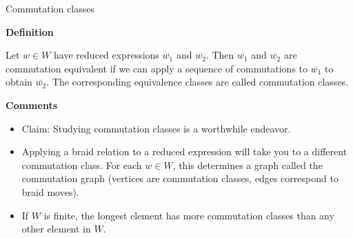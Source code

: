 \documentclass[10pt, compress,aspectratio=169,handout]{beamer}
\begin{document}
\begin{frame}{Commutation classes}\pause

\vspace{1em}

\begin{block}{\textbf{Definition}}
\vspace{-.5em}

Let $w \in W$ have reduced expressions $\overline{w_1}$ and $\overline{w_2}$. Then $\overline{w_1}$ and $\overline{w_2}$ are \alert{commutation equivalent} if we can apply a sequence of commutations to $\overline{w_1}$ to obtain $\overline{w_2}$. The corresponding equivalence classes are called \alert{commutation classes}.

\end{block}

\pause

\begin{block}{\textbf{Comments}}

\vspace{-.5em}

\begin{itemize}
\item \alert{Claim:} Studying commutation classes is a worthwhile endeavor. \pause
\item Applying a braid relation to a reduced expression will take you to a different commutation class. For each $w\in W$, this determines a graph called the \alert{commutation graph} (vertices are commutation classes, edges correspond to braid moves). \pause
\item If $W$ is finite, the longest element has more commutation classes than any other element in $W$.
\end{itemize}
\end{block}

\end{frame}

\end{document}
